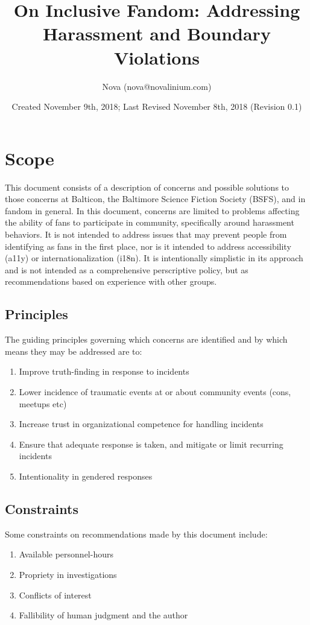 \documentclass{article}
\title{On Inclusive Fandom: Addressing Harassment and Boundary Violations}
\author{Nova (nova@novalinium.com)}
\date{Created November 9th, 2018; Last Revised November 8th, 2018 (Revision 0.1)}
\begin{document}
\maketitle
\section{Scope}
This document consists of a description of concerns and possible solutions to those concerns at Balticon, the Baltimore Science Fiction Society (BSFS), and in fandom in general. In this document, concerns are limited to problems affecting the ability of fans to participate in community, specifically around harassment behaviors. It is not intended to address issues that may prevent people from identifying as fans in the first place, nor is it intended to address accessibility (a11y) or internationalization (i18n). It is intentionally simplistic in its approach and is not intended as a comprehensive perscriptive policy, but as recommendations based on experience with other groups.

\subsection{Principles}
The guiding principles governing which concerns are identified and by which means they may be addressed are to:
\begin{enumerate}
    \item Improve truth-finding in response to incidents
    \item Lower incidence of traumatic events at or about community events (cons, meetups etc)
    \item Increase trust in organizational competence for handling incidents
    \item Ensure that adequate response is taken, and mitigate or limit recurring incidents
    \item Intentionality in gendered responses
\end{enumerate}

\subsection{Constraints}
Some constraints on recommendations made by this document include:
\begin{enumerate}
    \item Available personnel-hours
    \item Propriety in investigations
    \item Conflicts of interest
    \item Fallibility of human judgment and the author
\end{enumerate}
\end{document}
